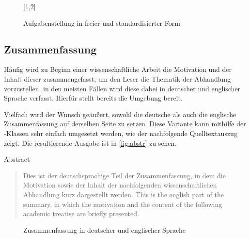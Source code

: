 \documentclass[%
  english,ngerman,%
  geometry=no,DIV=12,automark,%
]{tudscrartcl}
\begin{document}
%
\begin{figure}
[1,2]
\caption{Aufgabenstellung in freier und standardisierter Form}
\label{fig:task}
\end{figure}


\subsection{Zusammenfassung}
Häufig wird zu Beginn einer wissenschaftliche Arbeit die Motivation und der 
Inhalt dieser zusammengefasst, um den Leser die Thematik der Abhandlung 
vorzustellen. in den meisten Fällen wird diese dabei in deutscher und 
englischer Sprache verfasst. Hierfür stellt \KOMAScript{} bereits die Umgebung 
 bereit.

Vielfach wird der Wunsch geäußert, sowohl die deutsche als auch die englische 
Zusammenfassung auf derselben Seite zu setzen. Diese Variante kann mithilfe 
der \TUDScript-Klassen sehr einfach umgesetzt werden, wie der nachfolgende 
Quelltextauszug zeigt. Die resultierende Ausgabe ist in \autoref{fig:abstr} zu 
sehen.
%
\begin{Tutorial!}{Abstract}
\begin{abstract}
  Dies ist der deutschsprachige Teil der Zusammenfassung, in dem die
  Motivation sowie der Inhalt der nachfolgenden wissenschaftlichen
  Abhandlung kurz dargestellt werden.
\nextabstract[english]
  This is the english part of the summary, in which the motivation and
  the content of the following academic treatise are briefly presented.
\end{abstract}
\end{Tutorial!}
%
\begin{figure}
\centering
{}
\caption{Zusammenfassung in deutscher und englischer Sprache}
\label{fig:abstr}
\end{figure}
\end{document}
